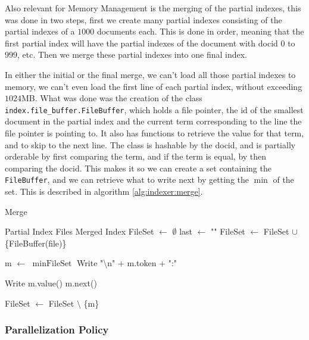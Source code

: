 \documentclass[sigconf,authorversion,nonacm]{acmart}
\def\code#1{\texttt{#1}}
\begin{document}
Also relevant for Memory Management is the merging of the partial indexes, this was done in two steps, first we create many partial indexes consisting of the partial indexes of a $1000$ documents each. This is done in order, meaning that the first partial index will have the partial indexes of the document with docid $0$ to $999$, etc. Then we merge these partial indexes into one final index.

In either the initial or the final merge, we can't load all those partial indexes to memory, we can't even load the first line of each partial index, without exceeding $1024$MB. What was done was the creation of the class \code{index.file\_buffer.FileBuffer}, which holds a file pointer, the id of the smallest document in the partial index and the current term corresponding to the line the file pointer is pointing to. It also has functions to retrieve the value for that term, and to skip to the next line. The class is hashable by the docid, and is partially orderable by first comparing the term, and if the term is equal, by then comparing the docid. This makes it so we can create a set containing the \code{FileBuffer}, and we can retrieve what to write next by getting the $\min$ of the set. This is described in algorithm \ref{alg:indexer:merge}.

\begin{algorithm}
  \caption{Merge}\label{alg:indexer:merge}
  \begin{algorithmic}
    \Require Partial Index Files
    \Ensure Merged Index
    \State FileSet $\gets$ $\emptyset$
    \State last $\gets$ ""
    \State FileSet $\gets$ FileSet $\cup$ \{FileBuffer(file)\}
    \EndFor

    \State m $\gets$ $\min{\text{FileSet}}$
    \State Write "\textbackslash n" + m.token + ":"
    \EndIf

    \State Write m.value()
    \State m.next()

    \State FileSet $\gets$ FileSet $\setminus$ \{m\}
    \EndIf

    \EndWhile

  \end{algorithmic}
\end{algorithm}

\subsubsection{Parallelization Policy}
\end{document}
